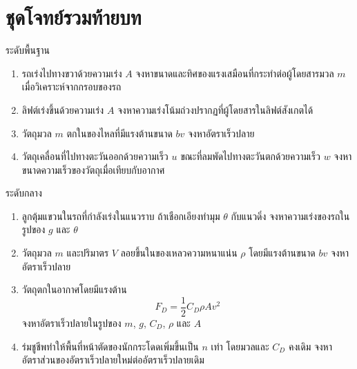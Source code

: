 \section{ชุดโจทย์รวมท้ายบท}

\begin{exercisebox}{ระดับพื้นฐาน}
\begin{enumerate}
    \item รถเร่งไปทางขวาด้วยความเร่ง $A$
    จงหาขนาดและทิศของแรงเสมือนที่กระทำต่อผู้โดยสารมวล $m$
    เมื่อวิเคราะห์จากกรอบของรถ

    \item ลิฟต์เร่งขึ้นด้วยความเร่ง $A$
    จงหาความเร่งโน้มถ่วงปรากฏที่ผู้โดยสารในลิฟต์สังเกตได้

    \item วัตถุมวล $m$ ตกในของไหลที่มีแรงต้านขนาด $bv$
    จงหาอัตราเร็วปลาย

    \item วัตถุเคลื่อนที่ไปทางตะวันออกด้วยความเร็ว $u$
    ขณะที่ลมพัดไปทางตะวันตกด้วยความเร็ว $w$
    จงหาขนาดความเร็วของวัตถุเมื่อเทียบกับอากาศ
\end{enumerate}
\end{exercisebox}

\begin{exercisebox}{ระดับกลาง}
\begin{enumerate}
    \item ลูกตุ้มแขวนในรถที่กำลังเร่งในแนวราบ
    ถ้าเชือกเอียงทำมุม $\theta$ กับแนวดิ่ง
    จงหาความเร่งของรถในรูปของ $g$ และ $\theta$

    \item วัตถุมวล $m$ และปริมาตร $V$ ลอยขึ้นในของเหลวความหนาแน่น $\rho$
    โดยมีแรงต้านขนาด $bv$
    จงหาอัตราเร็วปลาย

    \item วัตถุตกในอากาศโดยมีแรงต้าน
    \[
    F_D=\frac{1}{2}C_D\rho Av^2
    \]
    จงหาอัตราเร็วปลายในรูปของ $m$, $g$, $C_D$, $\rho$ และ $A$

    \item ร่มชูชีพทำให้พื้นที่หน้าตัดของนักกระโดดเพิ่มขึ้นเป็น $n$ เท่า
    โดยมวลและ $C_D$ คงเดิม
    จงหาอัตราส่วนของอัตราเร็วปลายใหม่ต่ออัตราเร็วปลายเดิม
\end{enumerate}
\end{exercisebox}

